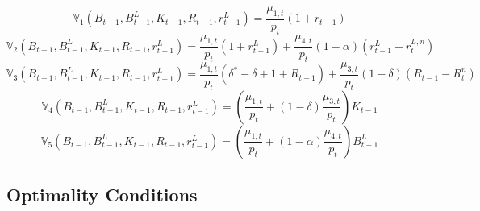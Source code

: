 \documentclass[11pt,a4paper,margin=1.5in]{article}
\begin{document}
\begin{equation}
	\mathbb{V}\!_1\left(B_{t-1}, B^L_{t-1}, K_{t-1}, R_{t-1}, r^L_{t-1}\right) = \frac{\mu_{1,t}}{p_t}(1+r_{t-1})
	\label{eq:HH_BS_B}
\end{equation}
%
\begin{equation}
	\mathbb{V}\!_2\left(B_{t-1}, B^L_{t-1}, K_{t-1}, R_{t-1}, r^L_{t-1}\right) = \frac{\mu_{1,t}}{p_t}(1+r^L_{t-1}) + \frac{\mu_{4,t}}{p_t}(1-\alpha)\left(r^L_{t-1} - r^{L,n}_t\right)
	\label{eq:HH_BS_BL}
\end{equation}
%
\begin{equation}
	\mathbb{V}\!_3\left(B_{t-1}, B^L_{t-1}, K_{t-1}, R_{t-1}, r^L_{t-1}\right) = \frac{\mu_{1,t}}{p_t}(\delta^*- \delta + 1 + R_{t-1}) + \frac{\mu_{3,t}}{p_t}(1-\delta)\left(R_{t-1} - R^{n}_t\right)
	\label{eq:HH_BS_K}
\end{equation}
%
\begin{equation}
	\mathbb{V}\!_4\left(B_{t-1}, B^L_{t-1}, K_{t-1}, R_{t-1}, r^L_{t-1}\right) = \left(\frac{\mu_{1,t}}{p_t} + (1-\delta)\frac{\mu_{3,t}}{p_t}\right)K_{t-1}
	\label{eq:HH_BS_R}
\end{equation}
%
\begin{equation}
	\mathbb{V}\!_5\left(B_{t-1}, B^L_{t-1}, K_{t-1}, R_{t-1}, r^L_{t-1}\right) = \left(\frac{\mu_{1,t}}{p_t} + (1-\alpha)\frac{\mu_{4,t}}{p_t}\right)B^L_{t-1}
	\label{eq:HH_BS_rL}
\end{equation}

\subsection{Optimality Conditions}
\end{document}
